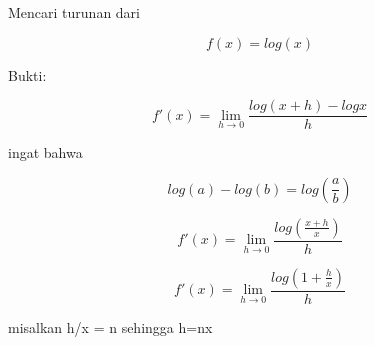 \documentclass[a4paper,10pt]{article}
\begin{document}
\begin{eulernotebook}
\begin{eulercomment}
\begin{eulercomment}
\begin{eulercomment}
\begin{eulercomment}
\begin{eulercomment}
\begin{eulercomment}
\begin{eulercomment}
\begin{eulercomment}
\begin{eulercomment}
\begin{eulercomment}
\begin{eulercomment}
\begin{eulercomment}
\begin{eulercomment}
\begin{eulercomment}
\begin{eulercomment}
\begin{eulercomment}
\begin{eulercomment}
\begin{eulercomment}
\begin{eulercomment}
\begin{eulercomment}
\begin{eulercomment}
\end{eulercomment}
\begin{eulercomment}
Mencari turunan dari\\
\end{eulercomment}
\begin{eulerformula}
\[
f(x)= log(x)
\]
\end{eulerformula}
\begin{eulercomment}
Bukti:\\
\end{eulercomment}
\begin{eulerformula}
\[
f'(x) = \lim_{h\to 0} \frac{log(x+h)-log x}{h}
\]
\end{eulerformula}
\begin{eulercomment}
ingat bahwa\\
\end{eulercomment}
\begin{eulerformula}
\[
log(a)-log(b)= log (\frac{a}{b})
\]
\end{eulerformula}
\begin{eulercomment}
\end{eulercomment}
\begin{eulerformula}
\[
f'(x)=\lim_{h\to 0}\frac{ log (\frac{x+h}{x})}{h}
\]
\end{eulerformula}
\begin{eulerformula}
\[
f'(x)=\lim_{h\to 0}\frac{ log (1 + \frac{h}{x})}{h}
\]
\end{eulerformula}
\begin{eulercomment}
misalkan h/x = n sehingga h=nx


\end{eulercomment}
\end{eulercomment}
\end{eulercomment}
\end{eulercomment}
\end{eulercomment}
\end{eulercomment}
\end{eulercomment}
\end{eulercomment}
\end{eulercomment}
\end{eulercomment}
\end{eulercomment}
\end{eulercomment}
\end{eulercomment}
\end{eulercomment}
\end{eulercomment}
\end{eulercomment}
\end{eulercomment}
\end{eulercomment}
\end{eulercomment}
\end{eulercomment}
\end{eulercomment}
\end{eulernotebook}
\end{document}

